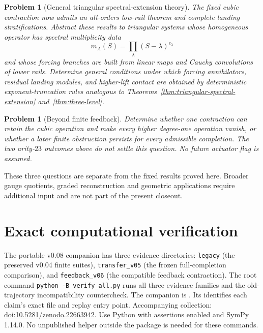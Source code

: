 \documentclass[11pt]{amsart}
\newtheorem{problem}[theorem]{Problem}
\begin{document}
\begin{problem}[General triangular spectral-extension theory]
The fixed cubic contraction now admits an all-orders low-rail theorem and complete landing stratifications.  Abstract these results to triangular systems whose homogeneous operator has spectral multiplicity data
\[
m_A(S)=\prod_\lambda(S-\lambda)^{e_\lambda}
\]
and whose forcing branches are built from linear maps and Cauchy convolutions of lower rails.  Determine general conditions under which forcing annihilators, residual landing modules, and higher-lift contact are obtained by deterministic exponent-truncation rules analogous to Theorems~\ref{thm:triangular-spectral-extension} and~\ref{thm:three-level}.
\end{problem}

\begin{problem}[Beyond finite feedback]
Determine whether one contraction can retain the cubic operation and make every
higher degree-one operation vanish, or whether a later finite obstruction
persists for every admissible completion. The two arity-$23$ outcomes above
do not settle this question. No future actuator flag is assumed.
\end{problem}

These three questions are separate from the fixed results proved here.
Broader gauge quotients, graded reconstruction and geometric applications
require additional input and are not part of the present closeout.

\clearpage
\appendix

\section{Exact computational verification}\label{sec:exact-verification}

The portable v0.08 companion has three evidence directories:
\texttt{legacy} (the preserved v0.04 finite suites),
\texttt{transfer\_v05} (the frozen full-completion comparison), and
\texttt{feedback\_v06} (the compatible feedback contraction).
The root command \texttt{python -B verify\_all.py} runs all three evidence
families and the old-trajectory incompatibility countercheck.
The companion is .
Its  identifies each claim's exact file and replay
entry point. Accompanying collection: \href{https://doi.org/10.5281/zenodo.22663942}{doi:10.5281/zenodo.22663942}.
Use Python with assertions enabled and SymPy 1.14.0.
No unpublished helper outside the package is needed for these commands.
\end{document}
